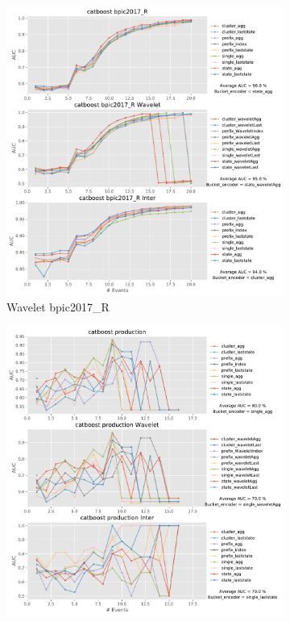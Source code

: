 \begin{figure}[!htbp] %

	\begin{subfigure}{0.48\textwidth}
		\includegraphics[width=\linewidth]{images/inter/catboost/bpic2017_R.pdf}
		\caption{Wavelet bpic2017\_R} \label{fig:b17ri}
	\end{subfigure}\hspace*{\fill}
	\begin{subfigure}{0.48\textwidth}
		\includegraphics[width=\linewidth]{images/inter/catboost/production.pdf}

\end{subfigure}
\end{figure}
